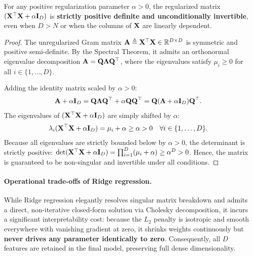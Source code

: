 \begin{theorem}
For any positive regularization parameter $\alpha > 0$, the regularized matrix $(\mathbf{X}^\top \mathbf{X} + \alpha \mathbf{I}_D)$ is \textbf{strictly positive definite and unconditionally invertible}, even when $D > N$ or when the columns of $\mathbf{X}$ are linearly dependent.
\end{theorem}
\begin{proof}
The unregularized Gram matrix $\mathbf{A} \triangleq \mathbf{X}^\top \mathbf{X} \in \mathbb{R}^{D \times D}$ is symmetric and positive semi-definite. By the Spectral Theorem, it admits an orthonormal eigenvalue decomposition $\mathbf{A} = \mathbf{Q} \boldsymbol{\Lambda} \mathbf{Q}^\top$, where the eigenvalues satisfy $\mu_i \ge 0$ for all $i \in \{1, \dots, D\}$. 

Adding the identity matrix scaled by $\alpha > 0$:
\begin{equation}
\mathbf{A} + \alpha \mathbf{I}_D = \mathbf{Q} \boldsymbol{\Lambda} \mathbf{Q}^\top + \alpha \mathbf{Q}\mathbf{Q}^\top = \mathbf{Q}(\boldsymbol{\Lambda} + \alpha \mathbf{I}_D)\mathbf{Q}^\top.
\label{eq:ridge_eigen_decomp}
\end{equation}
The eigenvalues of $(\mathbf{X}^\top \mathbf{X} + \alpha \mathbf{I}_D)$ are simply shifted by $\alpha$:
\begin{equation}
\lambda_i(\mathbf{X}^\top \mathbf{X} + \alpha \mathbf{I}_D) = \mu_i + \alpha \ge \alpha > 0 \quad \forall i \in \{1, \dots, D\}.
\label{eq:eigenvalues_shifted}
\end{equation}
Because all eigenvalues are strictly bounded below by $\alpha > 0$, the determinant is strictly positive: $\det(\mathbf{X}^\top \mathbf{X} + \alpha \mathbf{I}_D) = \prod_{i=1}^D (\mu_i + \alpha) \ge \alpha^D > 0$. Hence, the matrix is guaranteed to be non-singular and invertible under all conditions.
\end{proof}

\paragraph{Operational trade-offs of Ridge regression.}
While Ridge regression elegantly resolves singular matrix breakdown and admits a direct, non-iterative closed-form solution via Cholesky decomposition, it incurs a significant interpretability cost: because the $L_2$ penalty is isotropic and smooth everywhere with vanishing gradient at zero, it shrinks weights continuously but \textbf{never drives any parameter identically to zero}. Consequently, all $D$ features are retained in the final model, preserving full dense dimensionality.

